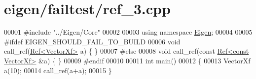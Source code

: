 \hypertarget{eigen_2failtest_2ref__3_8cpp_source}{}\section{eigen/failtest/ref\+\_\+3.cpp}
\label{eigen_2failtest_2ref__3_8cpp_source}

\begin{DoxyCode}
00001 \textcolor{preprocessor}{#include "../Eigen/Core"}
00002 
00003 \textcolor{keyword}{using namespace }\hyperlink{namespace_eigen}{Eigen};
00004 
00005 \textcolor{preprocessor}{#ifdef EIGEN\_SHOULD\_FAIL\_TO\_BUILD}
00006 \textcolor{keywordtype}{void} call\_ref(\hyperlink{group___core___module_class_eigen_1_1_ref}{Ref<VectorXf>} a) \{ \}
00007 \textcolor{preprocessor}{#else}
00008 \textcolor{keywordtype}{void} call\_ref(\textcolor{keyword}{const} \hyperlink{group___core___module_class_eigen_1_1_ref}{Ref<const VectorXf>} &a) \{ \}
00009 \textcolor{preprocessor}{#endif}
00010 
00011 \textcolor{keywordtype}{int} main()
00012 \{
00013   VectorXf a(10);
00014   call\_ref(a+a);
00015 \}
\end{DoxyCode}
